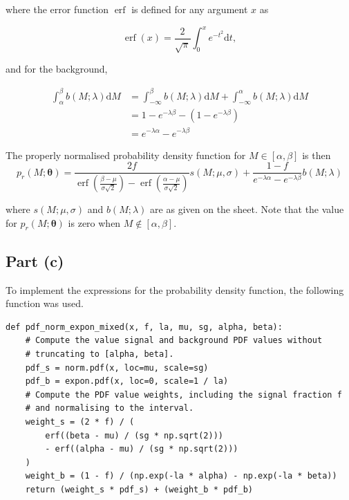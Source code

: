 \documentclass[12pt]{article}
\DeclareMathOperator{\erf}{erf}
\begin{document}
where the error function $\erf$ is defined for any argument $x$ as

\[
    \erf(x) = \frac{2}{\sqrt\pi}\int_0^xe^{-t^2}\mathrm{d}t,
\]

and for the background,

\begin{align*}
    \int_\alpha^\beta b(M;\lambda)\mathrm{d}M & = \int_{-\infty}^\beta b(M;\lambda)\mathrm{d}M + \int_{-\infty}^\alpha b(M;\lambda)\mathrm{d}M \\
    & = 1 - e^{-\lambda\beta} - (1 - e^{-\lambda\beta}) \\
    & = e^{-\lambda\alpha} - e^{-\lambda\beta}
\end{align*}

The properly normalised probability density function for $M\in[\alpha,\beta]$ is then
\begin{equation}
\label{eqpdf}
    p_r(M;\boldsymbol{\theta}) = \frac{2f}{\erf\left(\frac{\beta - \mu}{\sigma\sqrt{2}}\right) - \erf\left(\frac{\alpha - \mu}{\sigma\sqrt{2}}\right)}s(M;\mu,\sigma) + \frac{1-f}{e^{-\lambda\alpha} - e^{-\lambda\beta}}b(M;\lambda)
\end{equation}

where $s(M;\mu,\sigma)$ and $b(M;\lambda)$ are as given on the sheet.
Note that the value for $p_r(M;\boldsymbol{\theta})$ is zero when $M\notin[\alpha,\beta]$.

\subsection*{Part (c)}

To implement the expressions for the probability density function, the following function was used.

\begin{lstlisting}[caption=Function implementing PDF for part (c).,]
    def pdf_norm_expon_mixed(x, f, la, mu, sg, alpha, beta):
    # Compute the value signal and background PDF values without
    # truncating to [alpha, beta].
    pdf_s = norm.pdf(x, loc=mu, scale=sg)
    pdf_b = expon.pdf(x, loc=0, scale=1 / la)
    # Compute the PDF value weights, including the signal fraction f
    # and normalising to the interval.
    weight_s = (2 * f) / (
        erf((beta - mu) / (sg * np.sqrt(2)))
        - erf((alpha - mu) / (sg * np.sqrt(2)))
    )
    weight_b = (1 - f) / (np.exp(-la * alpha) - np.exp(-la * beta))
    return (weight_s * pdf_s) + (weight_b * pdf_b)
\end{lstlisting}
\end{document}

